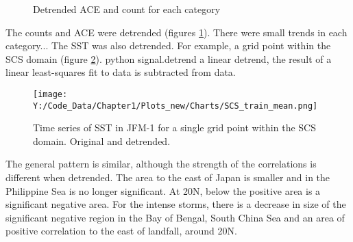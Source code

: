 \begin{figure}[h]

		 
	\caption{Detrended ACE and count for each category}\label{fig:detrend}
\end{figure}


The counts and ACE were detrended (figures \ref{fig:detrend}). There were small trends in each category...
The SST was also detrended. For example, a grid point within the SCS domain (figure \ref{fig:SCS_detrend}).
python signal.detrend a linear detrend, the result of a linear least-squares fit to data is subtracted from data.

\begin{figure}[h]
	\centering
	\noindent\texttt{[image: Y:/Code\_Data/Chapter1/Plots\_new/Charts/SCS\_train\_mean.png]}
	\caption{Time series of SST in JFM-1 for a single grid point within the SCS domain. Original and detrended.}\label{fig:SCS_detrend}
\end{figure}

The general pattern is similar, although the strength of the correlations is different when detrended. The area to the east of Japan is smaller and in the Philippine Sea is no longer significant. At 20N, below the positive area is a significant negative area.
For the intense storms, there is a decrease in size of the significant negative region in the Bay of Bengal, South China Sea and an area of positive correlation to the east of landfall, around 20N.


